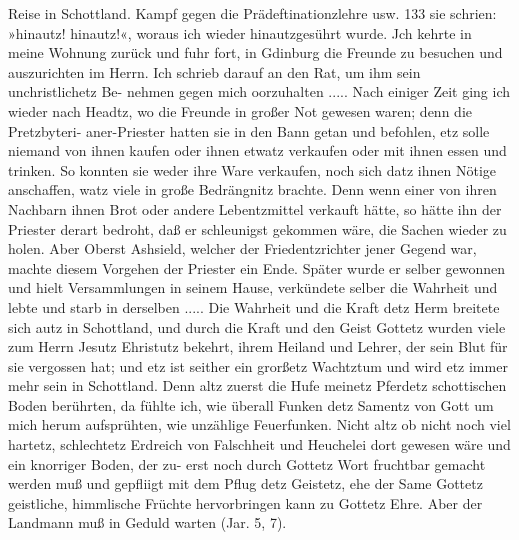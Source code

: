 Reise in Schottland. Kampf gegen die Prädeftinationzlehre usw. 133
sie schrien: »hinautz! hinautz!«, woraus ich wieder hinautzgesührt
wurde. Jch kehrte in meine Wohnung zurück und fuhr fort, in
Gdinburg die Freunde zu besuchen und auszurichten im Herrn.
Ich schrieb darauf an den Rat, um ihm sein unchristlichetz Be-
nehmen gegen mich oorzuhalten .....
Nach einiger Zeit ging ich wieder nach Headtz, wo die
Freunde in großer Not gewesen waren; denn die Pretzbyteri-
aner-Priester hatten sie in den Bann getan und befohlen,
etz solle niemand von ihnen kaufen oder ihnen etwatz
verkaufen oder mit ihnen essen und trinken. So konnten sie weder
ihre Ware verkaufen, noch sich datz ihnen Nötige anschaffen, watz
viele in große Bedrängnitz brachte. Denn wenn einer von ihren
Nachbarn ihnen Brot oder andere Lebentzmittel verkauft hätte, so
hätte ihn der Priester derart bedroht, daß er schleunigst gekommen
wäre, die Sachen wieder zu holen. Aber Oberst Ashsield, welcher
der Friedentzrichter jener Gegend war, machte diesem Vorgehen
der Priester ein Ende. Später wurde er selber gewonnen und hielt
Versammlungen in seinem Hause, verkündete selber die Wahrheit
und lebte und starb in derselben .....
Die Wahrheit und die Kraft detz Herm breitete sich autz in
Schottland, und durch die Kraft und den Geist Gottetz wurden
viele zum Herrn Jesutz Ehristutz bekehrt, ihrem Heiland und Lehrer,
der sein Blut für sie vergossen hat; und etz ist seither ein grorßetz
Wachtztum und wird etz immer mehr sein in Schottland. Denn
altz zuerst die Hufe meinetz Pferdetz schottischen Boden berührten,
da fühlte ich, wie überall Funken detz Samentz von Gott um mich
herum aufsprühten, wie unzählige Feuerfunken. Nicht altz ob
nicht noch viel hartetz, schlechtetz Erdreich von Falschheit und
Heuchelei dort gewesen wäre und ein knorriger Boden, der zu-
erst noch durch Gottetz Wort fruchtbar gemacht werden muß
und gepfliigt mit dem Pflug detz Geistetz, ehe der Same Gottetz
geistliche, himmlische Früchte hervorbringen kann zu Gottetz Ehre.
Aber der Landmann muß in Geduld warten (Jar. 5, 7).


